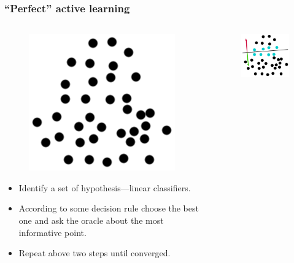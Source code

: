 \documentclass{beamer}
\begin{document}
  \begin{frame}
    \frametitle{``Perfect'' active learning}
    \begin{columns}
      \begin{column}{5.5cm}
        \begin{figure}
          \includegraphics[scale=.25]{graphics/presentation/clusters2} 
        \end{figure}
        \begin{itemize}
          \item Identify a set of hypothesis---linear classifiers.
          \item According to some decision rule choose the best one and ask the oracle about the most informative point.
          \item Repeat above two steps until converged.
        \end{itemize}
      \end{column}
      \begin{column}{4.5cm}
        \begin{figure}
          \includegraphics[scale=.5]{graphics/presentation/al1e} 
        \end{figure}
      \end{column}
    \end{columns}
  \end{frame}
\end{document}
